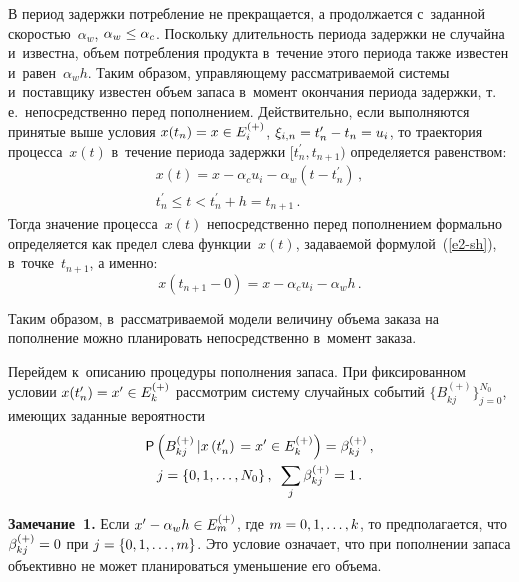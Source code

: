 \begin{multicols}{2}
    В период задержки потребление не прекращается, а продолжается 
с~заданной ско\-ростью~$\alpha_w$, $\alpha_w\hm\leq \alpha_c$. Поскольку 
длительность периода задержки не случайна и~из\-вест\-на, объем потребления 
продукта в~течение этого периода также из\-вес\-тен и~равен~$\alpha_w h$. Таким 
образом, управляющему рассматриваемой системы и~поставщику известен 
объем запаса в~момент окончания периода задержки, т.\,е.\ непосредственно 
перед пополнением. Действительно, если выполняются принятые выше условия 
$x(t_n)\hm= x\hm\in E_i^{(+)}$, $\xi_{i,n}\hm= t_n^\prime \hm- t_n\hm= u_i$, то 
траектория процесса~$x(t)$ в~течение периода задержки $[t_n^\prime, 
t_{n+1})$ определяется равенством:
    \begin{multline}
    x(t)=x-\alpha_c u_i -\alpha_w (t-t^\prime_n)\,,\\
    t_n^\prime \leq t< t^\prime_n+h=t_{n+1}\,.
    \label{e2-sh}
    \end{multline}
        Тогда значение процесса~$x(t)$ непосредственно перед пополнением 
формально определяется как предел слева функции~$x(t)$, задаваемой 
формулой~(\ref{e2-sh}), в~точке~$t_{n+1}$, а именно:
    $$
    x\left(t_{n+1}-0\right) =x-\alpha_c u_i -\alpha_w h\,.
    $$
    
    Таким образом, в~рассматриваемой модели величину объема заказа на 
пополнение можно планировать непосредственно в~момент заказа. 
  
  Перейдем к~описанию процедуры пополнения запаса. При фиксированном 
условии $x(t_n^\prime)\hm= x^\prime\hm\in E_k^{(+)}$ рассмотрим систему 
случайных событий $\{B^{(+)}_{kj}\}^{N_0}_{j=0}$, имеющих заданные 
вероятности
  \begin{multline*}
  {\sf P}\left( B^{(+)}_{kj}\left\vert x\left(t_n^\prime\right) \right. =x^\prime\in 
E_k^{(+)}\right) =\beta^{(+)}_{kj}\,,\\ 
  j=\{0,1,\ldots ,N_0\}\,,\enskip
   \sum\limits_j \beta^{(+)}_{kj}=1\,.
  \end{multline*}
  
  \noindent
  \textbf{Замечание~1.} Если $x^\prime\hm-\alpha_w h\hm\in E_m^{(+)}$, где $m 
\hm= 0, 1, \ldots, k$, то предполагается, что $\beta_{kj}^{(+)}\hm=0$ при $j 
\hm= \{0, 1, \ldots, m\}$. Это условие означает, что при пополнении запаса 
объективно не может планироваться уменьшение его объема. 
  
  \smallskip
  

\end{multicols}
